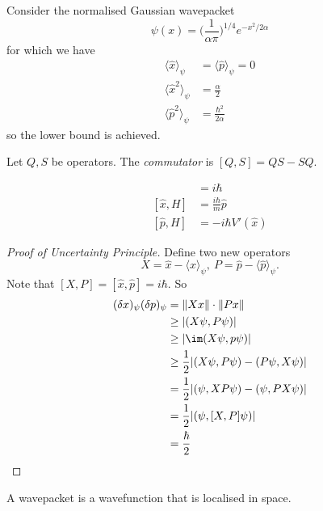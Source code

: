 \documentclass[a4paper]{article}
\theoremstyle{definition}
\begin{document}
\begin{eg}
  Consider the normalised Gaussian wavepacket
  \[
    \psi(x) = \Big( \frac{1}{\alpha\pi} \Big)^{1/4} e^{-x^2/2\alpha}
  \]
  for which we have
  \begin{align*}
    \langle\hat x\rangle_\psi &= \langle\hat p\rangle_\psi = 0 \\
    \langle\hat x^2\rangle_\psi &= \frac{\alpha}{2} \\
    \langle\hat p^2\rangle_\psi &= \frac{\hbar^2}{2\alpha}
  \end{align*}
  so the lower bound is achieved.
\end{eg}

\begin{defi}[Commutator]
  Let \(Q, S\) be operators. The \emph{commutator} is \([Q,S] = QS-SQ\).
\end{defi}

\begin{eg}
  \begin{align*}
    [\hat x,\hat p] &= i\hbar \\
    [\hat x, H] &= \frac{i\hbar}{m}\hat p \\
    [\hat p, H] &= -i\hbar V'(\hat x)
  \end{align*}
\end{eg}

\begin{proof}[Proof of Uncertainty Principle]
  Define two new operators
  \[
X = \hat x - \langle\hat x\rangle_\psi, \: P = \hat p - \langle\hat p\rangle_\psi.
  \]
  Note that \([X,P] = [\hat x,\hat p] = i\hbar\). So
 \begin{align*}
   (\delta x)_\psi (\delta p)_\psi &= \|X x\|\cdot\|P x\| \\
                                   &\geq |(X\psi, P\psi)| \\
                                   &\geq |\im (X\psi, p\psi)| \\
                                   &\geq \frac{1}{2} |(X\psi, P\psi)-(P\psi,X\psi)| \\
                                   &= \frac{1}{2} |(\psi,XP\psi)-(\psi,PX\psi)| \\
                                   &= \frac{1}{2} |(\psi,[X,P]\psi)| \\
                                   &= \frac{\hbar}{2}
 \end{align*}
\end{proof}

\begin{defi}[Wavepacket]
  A wavepacket is a wavefunction that is localised in space.
\end{defi}
\end{document}
